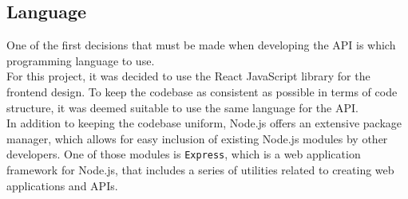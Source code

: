 \subsection{Language}
One of the first decisions that must be made when developing the API is which programming language to use.\\
For this project, it was decided to use the React JavaScript library for the frontend design.
To keep the codebase as consistent as possible in terms of code structure, it was deemed suitable to use the same language for the API.\\
In addition to keeping the codebase uniform, Node.js offers an extensive package manager, which allows for easy inclusion of existing Node.js modules by other developers.
One of those modules is \texttt{Express}, which is a web application framework for Node.js, that includes a series of utilities related to creating web applications and APIs.
